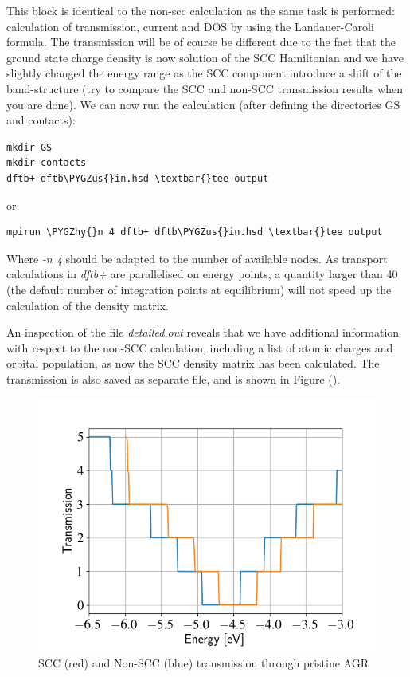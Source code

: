 \documentclass[a4paper,11pt,english]{sphinxmanual}
\def\PYGZus{\char`\_}
\def\PYGZhy{\char`\-}
\begin{document}
{{This block is identical to the non-scc calculation as the same task is
performed: calculation of transmission, current and DOS by using the
Landauer-Caroli formula. The transmission will be of course be
different due to the fact that the ground state charge density is now
solution of the SCC Hamiltonian and we have slightly changed the
energy range as the SCC component introduce a shift of the
band-structure (try to compare the SCC and non-SCC transmission results
when you are done). We can now run the calculation (after defining the
directories GS and contacts):

\begin{Verbatim}[commandchars=\\\{\}]
mkdir GS
mkdir contacts
dftb+ dftb\PYGZus{}in.hsd \textbar{}tee output
\end{Verbatim}

or:

\begin{Verbatim}[commandchars=\\\{\}]
mpirun \PYGZhy{}n 4 dftb+ dftb\PYGZus{}in.hsd \textbar{}tee output
\end{Verbatim}

Where \emph{-n 4} should be adapted to the number of available nodes. As
transport calculations in \emph{dftb+} are parallelised on energy points, a
quantity larger than 40 (the default number of integration points at
equilibrium) will not speed up the calculation of the density matrix.

An inspection of the file \emph{detailed.out} reveals that we have
additional information with respect to the non-SCC calculation,
including a list of atomic charges and orbital population, as now the
SCC density matrix has been calculated. The transmission is also saved
as separate file, and is shown in Figure {\hyperref[transport:fig-scc-tunn]{\emph{}}} ().
\begin{figure}[htbp]
\centering
\capstart
\includegraphics[width=0.800\linewidth]{scc-tunn.png}
\caption{SCC (red) and Non-SCC (blue) transmission through pristine AGR}\label{transport:fig-scc-tunn}\end{figure}

}}
\end{document}
